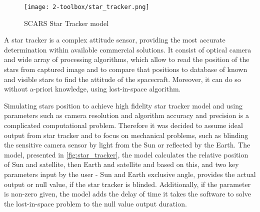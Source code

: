         \begin{figure}[h]
            \centering
            \texttt{[image: 2-toolbox/star\_tracker.png]}
            \caption{SCARS Star Tracker model}
            \label{fig:star_tracker}
        \end{figure}

        A star tracker is a complex attitude sensor, providing the most accurate determination within available commercial solutions. It consist of optical camera and wide array of processing algorithms, which allow to read the position of the stars from captured image and to compare that positions to database of known and visible stars to find the attitude of the spacecraft. Moreover, it can do so without a-priori knowledge, using lost-in-space algorithm\cite{delabie2016star}.

        Simulating stars position to achieve high fidelity star tracker model and using parameters such as camera resolution and algorithm accuracy and precision is a complicated computational problem. Therefore it was decided to assume ideal output from star tracker and to focus on mechanical problems, such as blinding the sensitive camera sensor by light from the Sun or reflected by the Earth. The model, presented in \autoref{fig:star_tracker}, the model calculates the relative position of Sun and satellite, then Earth and satellite and based on this, and two key parameters input by the user - Sun and Earth exclusive angle, provides the actual output or null value, if the star tracker is blinded. Additionally, if the parameter is non-zero given, the model adds the delay of time it takes the software to solve the lost-in-space problem to the null value output duration.
